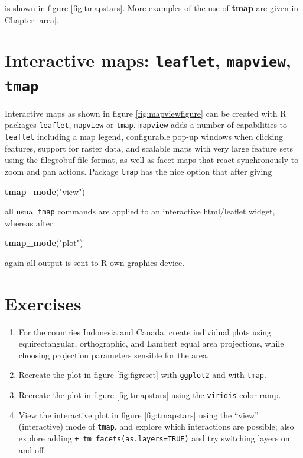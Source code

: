 \documentclass[]{book}
\newenvironment{Shaded}{\begin{snugshade}}{\end{snugshade}}
\newcommand{\KeywordTok}[1]{\textcolor[rgb]{0.13,0.29,0.53}{\textbf{#1}}}
\newcommand{\NormalTok}[1]{#1}
\newcommand{\StringTok}[1]{\textcolor[rgb]{0.31,0.60,0.02}{#1}}
\providecommand{\tightlist}{%
  \setlength{\itemsep}{0pt}\setlength{\parskip}{0pt}}
\begin{document}
is shown in figure \ref{fig:tmapstars}. More examples of the use of \textbf{tmap} are given in Chapter \ref{area}.

\hypertarget{interactive-maps-leaflet-mapview-tmap}{%
\section{\texorpdfstring{Interactive maps: \texttt{leaflet}, \texttt{mapview}, \texttt{tmap}}{Interactive maps: leaflet, mapview, tmap}}\label{interactive-maps-leaflet-mapview-tmap}}

Interactive maps as shown in figure \ref{fig:mapviewfigure} can be
created with R packages \texttt{leaflet}, \texttt{mapview} or \texttt{tmap}. \texttt{mapview}
adds a number of capabilities to \texttt{leaflet} including a map legend,
configurable pop-up windows when clicking features, support for
raster data, and scalable maps with very large feature sets using
the filegeobuf file format, as well as facet maps that react
synchronously to zoom and pan actions. Package \texttt{tmap} has the nice
option that after giving

\begin{Shaded}
\begin{Highlighting}[]
\KeywordTok{tmap_mode}\NormalTok{(}\StringTok{"view"}\NormalTok{)}
\end{Highlighting}
\end{Shaded}

all usual \texttt{tmap} commands are applied to an interactive html/leaflet widget,
whereas after

\begin{Shaded}
\begin{Highlighting}[]
\KeywordTok{tmap_mode}\NormalTok{(}\StringTok{"plot"}\NormalTok{)}
\end{Highlighting}
\end{Shaded}

again all output is sent to R own graphics device.

\hypertarget{exercises-8}{%
\section{Exercises}\label{exercises-8}}

\begin{enumerate}
\def\labelenumi{\arabic{enumi}.}
\tightlist
\item
  For the countries Indonesia and Canada, create individual plots using
  equirectangular, orthographic, and Lambert equal area projections, while
  choosing projection parameters sensible for the area.
\item
  Recreate the plot in figure \ref{fig:figreset} with \texttt{ggplot2} and with \texttt{tmap}.
\item
  Recreate the plot in figure \ref{fig:tmapstars} using the \texttt{viridis} color ramp.
\item
  View the interactive plot in figure \ref{fig:tmapstars} using the ``view''
  (interactive) mode of \texttt{tmap}, and explore which interactions are possible; also
  explore adding \texttt{+\ tm\_facets(as.layers=TRUE)} and try switching layers on and off.
\end{enumerate}
\end{document}
